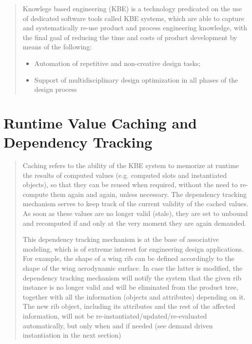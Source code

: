 \documentclass [11pt]{book}
\begin{document}
\begin{quote}
Knowlege based engineering (KBE) is a technology predicated on
the use of dedicated software tools called KBE systems, which are able
to capture and systematically re-use product and process engineering
knowledge, with the final goal of reducing the time and costs of
product development by means of the following:

\begin{itemize}

\item Automation of repetitive and non-creative design tasks;

\item Support of multidisciplinary design optimization in all  
phases of the design process

\end{itemize}



\end{quote}


\section{Runtime Value Caching and Dependency Tracking}

\label{sec:runtimevaluecachinganddependencytracking}



\begin{quote}


Caching refers to the ability of the KBE system to memorize at
runtime the results of computed values (e.g. computed slots and
instantiated objects), so that they can be reused when required,
without the need to re-compute them again and again, unless necessary.
The dependency tracking mechanism serves to keep track of the current
validity of the cached values.  As soon as these values are no longer
valid (stale), they are set to unbound and recomputed if and only at
the very moment they are again demanded.



This dependency tracking mechanism is at the base of associative
modeling, which is of extreme interest for engineering design
applications. For example, the shape of a wing rib can be defined
accordingly to the shape of the wing aerodynamic surface. In case the
latter is modified, the dependency tracking mechanism will notify the
system that the given rib instance is no longer valid and will be
eliminated from the product tree, together with all the
information (objects and attributes) depending on it. The new rib
object, including its attributes and the rest of the affected
information, will not be re-instantiated/updated/re-evaluated
automatically, but only when and if needed (see demand driven
instantiation in the next section)



\end{quote}
\end{document}
